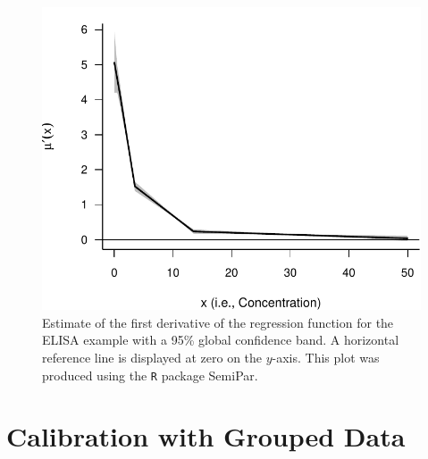 \documentclass[cmfont,usenames,dvipsnames,leqno]{afit-etd}\usepackage[]{graphicx}\usepackage[]{color}
\makeatletter
\def\maxwidth{ %
  \ifdim\Gin@nat@width>\linewidth
    \linewidth
  \else
    \Gin@nat@width
  \fi
}
\newenvironment{knitrout}{}{} %
\renewenvironment{knitrout}{\begin{singlespace}}{\end{singlespace}}
\newcommand{\code}[1]{\texttt{\small{#1}}}
\newcommand{\pkg}[1]{\textsf{\small{#1}}}
\makeatother
\begin{document}
\begin{knitrout}
\color{fgcolor}\begin{figure}[H]

\includegraphics[width=\maxwidth]{figure/derivative-plot} \caption[First derivative plot for the ELISA example]{Estimate of the first derivative of the regression function for the ELISA example with a 95\% global confidence band. A horizontal reference line is displayed at zero on the $y$-axis. This plot was produced using the \code{R} package \pkg{SemiPar}.\label{fig:derivative-plot}}
\end{figure}


\end{knitrout}








\chapter{Calibration with Grouped Data}
\label{chp:cal-dependent}

\end{document}
